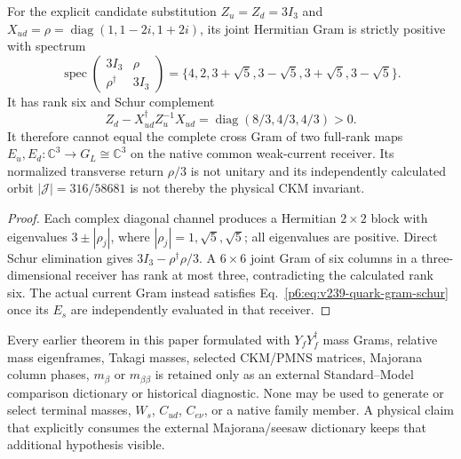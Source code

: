 \documentclass[12pt,a4paper]{article}
\begin{document}
\begin{proposition}
\label{p6:prop:v245-transverse-gram-rank-six}
For the explicit candidate substitution
$Z_u=Z_d=3I_3$ and
$X_{ud}=\rho=\operatorname{diag}(1,1-2i,1+2i)$,
its joint Hermitian Gram is strictly positive with spectrum
\[
 \boxed{\operatorname{spec}\begin{pmatrix}3I_3&\rho\\
  \rho^\dagger&3I_3\end{pmatrix}
 =\{4,2,3+\sqrt5,3-\sqrt5,3+\sqrt5,3-\sqrt5\}.}
\]
It has rank six and Schur complement
\[
 \boxed{Z_d-X_{ud}^\dagger Z_u^{-1}X_{ud}
 =\operatorname{diag}(8/3,4/3,4/3)>0.}
\]
It therefore cannot equal the complete cross Gram of two full-rank
maps $E_u,E_d:\mathbb C^3\to G_L\cong\mathbb C^3$ on the native
common weak-current receiver. Its normalized transverse return
$\rho/3$ is not unitary and its independently calculated orbit
$|\mathcal J|=316/58681$ is not thereby the physical CKM invariant.
\end{proposition}
\begin{proof}
Each complex diagonal channel produces a Hermitian $2\times2$
block with eigenvalues $3\pm|\rho_j|$, where
$|\rho_j|=1,\sqrt5,\sqrt5$; all eigenvalues are positive.
Direct Schur elimination gives $3I_3-\rho^\dagger\rho/3$.
A $6\times6$ joint Gram of six columns in a three-dimensional
receiver has rank at most three, contradicting the calculated rank six.
The actual current Gram instead satisfies
Eq.~\eqref{p6:eq:v239-quark-gram-schur} once its $E_s$ are
independently evaluated in that receiver.
\end{proof}

\begin{remark}
\label{p6:rem:v594-legacy-sm-flavor-dictionary-scope}
Every earlier theorem in this paper formulated with $Y_fY_f^\dagger$ mass
Grams, relative mass eigenframes, Takagi masses, selected CKM/PMNS matrices,
Majorana column phases, $m_\beta$ or $m_{\beta\beta}$ is retained only as an
external Standard--Model comparison dictionary or historical diagnostic.
None may be used to generate or select terminal masses, $W_s$, $C_{ud}$,
$C_{e\nu}$, or a native family member.  A physical claim that explicitly
consumes the external Majorana/seesaw dictionary keeps that additional
hypothesis visible.
\end{remark}
\end{document}
